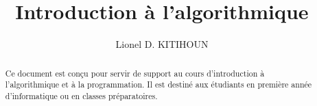 \documentclass[12pt]{report}
\title{Introduction à l'algorithmique}
\author{Lionel D. K\small{ITIHOUN}}
\begin{document}
\maketitle

\begin{abstract}
  Ce document est conçu pour servir de support au cours d'introduction à l'algorithmique et à la programmation. Il est destiné aux étudiants en première année d'informatique ou en classes préparatoires.
\end{abstract}
\end{document}
